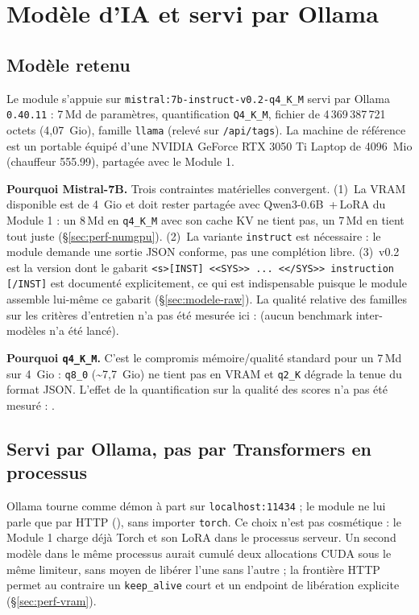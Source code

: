 \section{Modèle d'IA et servi par Ollama}
\label{sec:modele}

\subsection{Modèle retenu}

Le module s'appuie sur \texttt{mistral:7b-instruct-v0.2-q4\_K\_M} servi par
Ollama \texttt{0.40.11} : 7\,Md de paramètres, quantification \texttt{Q4\_K\_M},
fichier de 4\,369\,387\,721 octets (4,07~Gio), famille \texttt{llama}
(relevé sur \texttt{/api/tags}). La machine de référence est un
portable équipé d'une NVIDIA GeForce RTX 3050 Ti Laptop de 4096~Mio
(chauffeur 555.99), partagée avec le Module 1.

\textbf{Pourquoi Mistral-7B.} Trois contraintes matérielles convergent.
(1)~La VRAM disponible est de 4~Gio et doit rester partagée avec Qwen3-0.6B
\,+\,LoRA du Module 1 : un 8\,Md en \texttt{q4\_K\_M} avec son cache KV ne tient
pas, un 7\,Md en tient tout juste (§\ref{sec:perf-numgpu}). (2)~La variante
\texttt{instruct} est nécessaire : le module demande une sortie JSON conforme,
pas une complétion libre. (3)~v0.2 est la version dont le gabarit
\verb|<s>[INST] <<SYS>> ... <</SYS>> instruction [/INST]| est documenté
explicitement, ce qui est indispensable puisque le module assemble lui-même ce
gabarit (§\ref{sec:modele-raw}). La qualité relative des familles sur les
critères d'entretien n'a pas été mesurée ici : \NM{} (aucun benchmark
inter-modèles n'a été lancé).

\textbf{Pourquoi \texttt{q4\_K\_M}.} C'est le compromis mémoire/qualité standard
pour un 7\,Md sur 4~Gio : \texttt{q8\_0} (\textasciitilde{}7,7~Gio) ne tient pas
en VRAM et \texttt{q2\_K} dégrade la tenue du format JSON. L'effet de la
quantification sur la qualité des scores n'a pas été mesuré : \NM{}.

\subsection{Servi par Ollama, pas par Transformers en processus}
\label{sec:modele-ollama}

Ollama tourne comme démon à part sur \texttt{localhost:11434} ; le module ne lui
parle que par HTTP (), sans importer \texttt{torch}. Ce choix
n'est pas cosmétique : le Module 1 charge déjà Torch et son LoRA dans le
processus serveur. Un second modèle dans le même processus aurait cumulé deux
allocations CUDA sous le même limiteur, sans moyen de libérer l'une sans
l'autre ; la frontière HTTP permet au contraire un
\texttt{keep\_alive} court et un endpoint de libération explicite
(§\ref{sec:perf-vram}).

